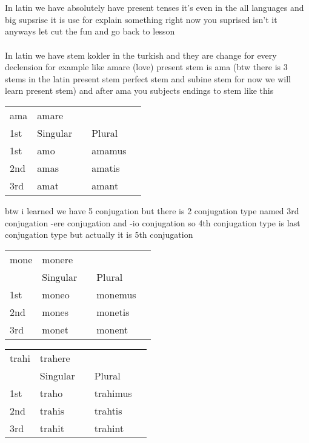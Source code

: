 \\\\
In latin we have absolutely have present tenses it's even in the all languages
and big supsrise it is use for explain something right now you suprised isn't it anyways
let cut the fun and go back to lesson \\\\
In latin we have stem kokler in the turkish and 
they are change for every declension for example like amare (love) present stem is ama (btw
there is 3 stems in the latin present stem perfect stem and subine stem for now we will learn present stem)
and after ama you subjects endings to stem like this
\begin{center}  
  \begin{tabular}{lllll}
      ama & amare & & & \\
      1st  & Singular  &   & Plural & \\
      1st & amo  &  & amamus &  \\
      2nd & amas &  & amatis &  \\
      3rd & amat &  & amant  &  \\
  \end{tabular}
\end{center}
btw i learned we have 5 conjugation but there is 2 conjugation type
named 3rd conjugation -ere conjugation and -io conjugation so 
4th conjugation type is last conjugation type but actually it is 5th conjugation
\begin{center}  
  \begin{tabular}{lllll}
    mone & monere & & & \\
      & Singular  &   & Plural & \\
      1st & moneo  &  & monemus &  \\
      2nd & mones &  & monetis &  \\
      3rd & monet &  & monent  &  \\
  \end{tabular}
\end{center}

\begin{center}  
  \begin{tabular}{lllll}
      trahi & trahere & & & \\
          & Singular  &   & Plural & \\
      1st & traho  &  & trahimus &  \\
      2nd & trahis &  & trahtis &  \\
      3rd & trahit &  & trahint  &  \\
  \end{tabular}
\end{center}


